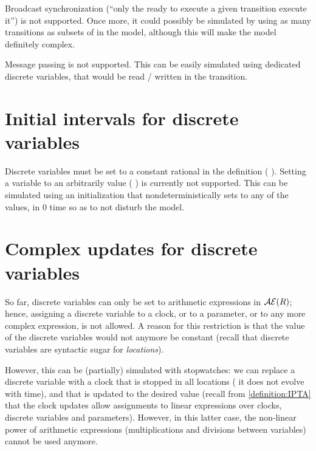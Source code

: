 

Broadcast synchronization (``only the \IPTA{} ready to execute a given transition execute it'') is not supported.
Once more, it could possibly be simulated by using as many transitions as subsets of \IPTA{} in the model, although this will make the model definitely complex.



Message passing is not supported.
This can be easily simulated using dedicated discrete variables, that would be read / written in the transition.



\section{Initial intervals for discrete variables}

Discrete variables must be set to a constant rational in the  definition (\eg{} ).
Setting a variable to an arbitrarily value (\eg{} ) is currently not supported.
This can be simulated using an initialization \IPTA{} that nondeterministically sets  to any of the values, in 0 time so as to not disturb the model.


\section{Complex updates for discrete variables}

So far, discrete variables can only be set to arithmetic expressions in $\mathcal{AE}(R)$;
hence, assigning a discrete variable to a clock, or to a parameter, or to any more complex expression, is not allowed.
A reason for this restriction is that the value of the discrete variables would not anymore be constant (recall that discrete variables are syntactic sugar for \emph{locations}).

However, this can be (partially) simulated with stopwatches: we can replace a discrete variable with a clock that is stopped in all locations (\ie{} it does not evolve with time), and that is updated to the desired value (recall from \cref{definition:IPTA} that the clock updates allow assignments to linear expressions over clocks, discrete variables and parameters).
However, in this latter case, the non-linear power of arithmetic expressions (multiplications and divisions between variables) cannot be used anymore.

